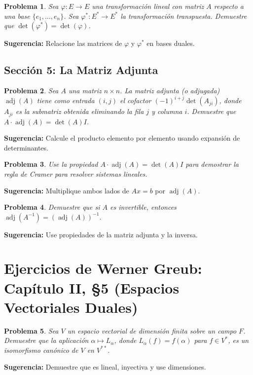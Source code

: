 \documentclass[12pt,a4paper]{article}
\newtheorem{problem}{Problema}
\newenvironment{suggestion}{\par\noindent\textbf{Sugerencia: }}{}
\begin{document}
\begin{problem}
Sea $\varphi:E\to E$ una transformación lineal con matriz $A$ respecto a una base $\{e_1,\dots,e_n\}$. Sea $\varphi^*:E^*\to E^*$ la transformación transpuesta. Demuestre que $\det(\varphi^*)=\det(\varphi)$.
\end{problem}
\begin{suggestion}
Relacione las matrices de $\varphi$ y $\varphi^*$ en bases duales.
\end{suggestion}

\subsection{Sección 5: La Matriz Adjunta}

\begin{problem}
Sea $A$ una matriz $n\times n$. La matriz adjunta (o adjugada) $\operatorname{adj}(A)$ tiene como entrada $(i,j)$ el cofactor $(-1)^{i+j}\det(A_{ji})$, donde $A_{ji}$ es la submatriz obtenida eliminando la fila $j$ y columna $i$. Demuestre que $A\cdot\operatorname{adj}(A)=\det(A)I$.
\end{problem}
\begin{suggestion}
Calcule el producto elemento por elemento usando expansión de determinantes.
\end{suggestion}

\begin{problem}
Use la propiedad $A\cdot\operatorname{adj}(A)=\det(A)I$ para demostrar la regla de Cramer para resolver sistemas lineales.
\end{problem}
\begin{suggestion}
Multiplique ambos lados de $Ax=b$ por $\operatorname{adj}(A)$.
\end{suggestion}

\begin{problem}
Demuestre que si $A$ es invertible, entonces $\operatorname{adj}(A^{-1})=(\operatorname{adj}(A))^{-1}$.
\end{problem}
\begin{suggestion}
Use propiedades de la matriz adjunta y la inversa.
\end{suggestion}

\section{Ejercicios de Werner Greub: Capítulo II, §5 (Espacios Vectoriales Duales)}

\begin{problem}
Sea $V$ un espacio vectorial de dimensión finita sobre un campo $F$. Demuestre que la aplicación $\alpha\mapsto L_\alpha$, donde $L_\alpha(f)=f(\alpha)$ para $f\in V^*$, es un isomorfismo canónico de $V$ en $V^{**}$.
\end{problem}
\begin{suggestion}
Demuestre que es lineal, inyectiva y use dimensiones.
\end{suggestion}
\end{document}
